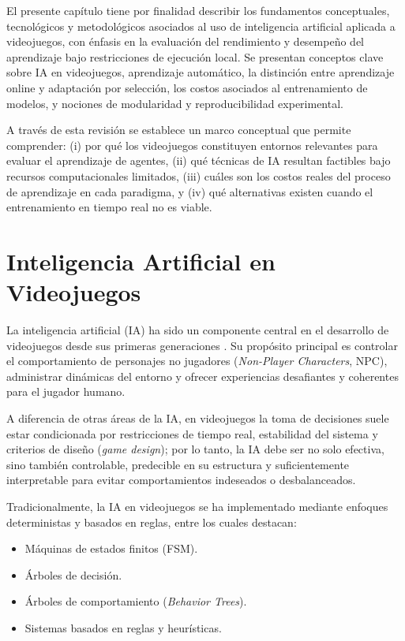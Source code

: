 El presente capítulo tiene por finalidad describir los fundamentos conceptuales, tecnológicos y metodológicos asociados al uso de inteligencia artificial aplicada a videojuegos, con énfasis en la evaluación del rendimiento y desempeño del aprendizaje bajo restricciones de ejecución local. Se presentan conceptos clave sobre IA en videojuegos, aprendizaje automático, la distinción entre aprendizaje online y adaptación por selección, los costos asociados al entrenamiento de modelos, y nociones de modularidad y reproducibilidad experimental.

A través de esta revisión se establece un marco conceptual que permite comprender: (i) por qué los videojuegos constituyen entornos relevantes para evaluar el aprendizaje de agentes, (ii) qué técnicas de IA resultan factibles bajo recursos computacionales limitados, (iii) cuáles son los costos reales del proceso de aprendizaje en cada paradigma, y (iv) qué alternativas existen cuando el entrenamiento en tiempo real no es viable.

\section{Inteligencia Artificial en Videojuegos}

La inteligencia artificial (IA) ha sido un componente central en el desarrollo de videojuegos desde sus primeras generaciones \cite{yannakakis2018ai}. Su propósito principal es controlar el comportamiento de personajes no jugadores (\textit{Non-Player Characters}, NPC), administrar dinámicas del entorno y ofrecer experiencias desafiantes y coherentes para el jugador humano.

A diferencia de otras áreas de la IA, en videojuegos la toma de decisiones suele estar condicionada por restricciones de tiempo real, estabilidad del sistema y criterios de diseño (\textit{game design}); por lo tanto, la IA debe ser no solo efectiva, sino también controlable, predecible en su estructura y suficientemente interpretable para evitar comportamientos indeseados o desbalanceados.

Tradicionalmente, la IA en videojuegos se ha implementado mediante enfoques deterministas y basados en reglas, entre los cuales destacan:

\begin{itemize}
    \item Máquinas de estados finitos (FSM).
    \item Árboles de decisión.
    \item Árboles de comportamiento (\textit{Behavior Trees}).
    \item Sistemas basados en reglas y heurísticas.
\end{itemize}

